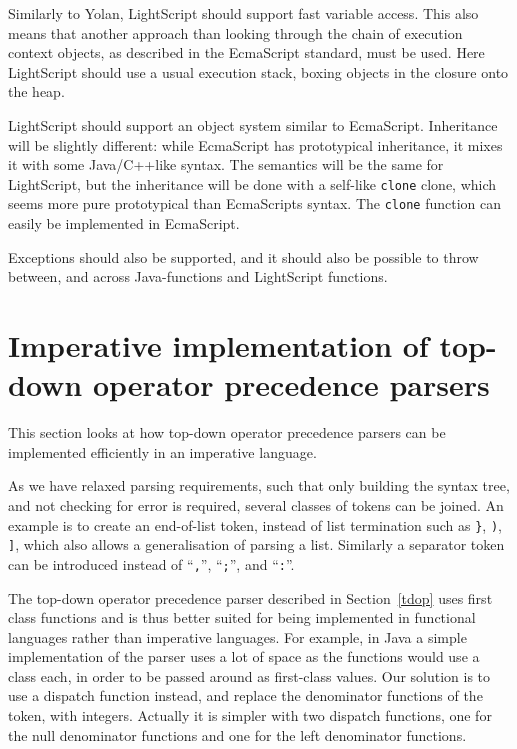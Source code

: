 \documentclass[11pt]{report}
\begin{document}
Similarly to Yolan, LightScript should support fast variable access. This also means that another approach than looking through the chain of execution context objects, as described in the EcmaScript standard, must be used. Here LightScript should use a usual execution stack, boxing objects in the closure onto the heap.

LightScript should support an object system similar to EcmaScript.
Inheritance will be slightly different: while EcmaScript has prototypical inheritance, it mixes it with some Java/C++like syntax. The semantics will be the same for LightScript, but the inheritance will be done with a self-like \verb|clone| clone, which seems more pure prototypical than EcmaScripts syntax. The \verb|clone| function can easily be implemented in EcmaScript.

Exceptions should also be supported, and it should also be possible to throw between, and across Java-functions and LightScript functions.

\section{Imperative implementation of top-down operator precedence parsers}
\label{tdop-imp}
This section looks at how top-down operator precedence parsers can be implemented efficiently in an imperative language.

As we have relaxed parsing requirements, such that only building the syntax tree, and not checking for error is required, several classes of tokens can be joined. An example is to create an end-of-list token, instead of list termination such as \verb|}|, \verb|)|, \verb|]|, which also allows a generalisation of parsing a list. Similarly a separator token can be introduced instead of ``\verb|,|'', ``\verb|;|'', and ``\verb|:|''.

The top-down operator precedence parser described in Section~\ref{tdop} 
uses first class functions and is thus better suited for being implemented in functional languages rather than imperative languages.
For example, in Java a simple implementation of the parser uses a lot of space as the functions would use a class each, in order to be passed around as first-class values.
Our solution is to use a dispatch function instead, and replace the denominator functions of the token, with integers.
Actually it is simpler with two dispatch functions, one for the null denominator functions and one for the left denominator functions.
\end{document}
